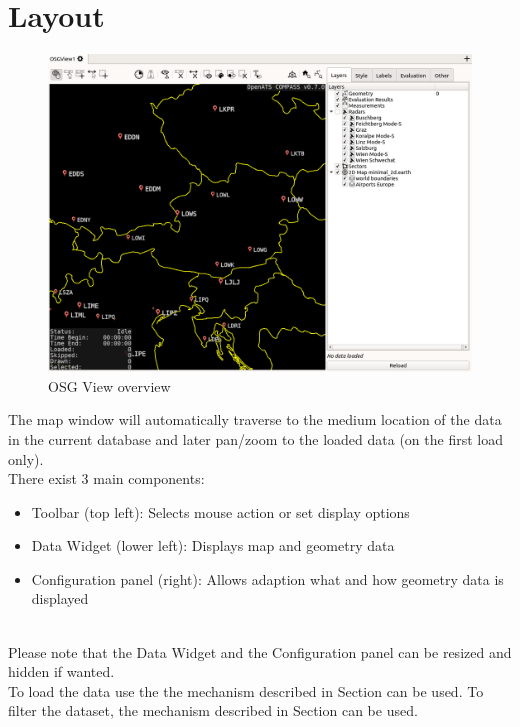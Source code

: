 \section{Layout}

\begin{figure}[H]
    \hspace*{-2.5cm}
    \includegraphics[width=19cm,frame]{figures/osgview_overview.png}
  \caption{OSG View overview}
  \label{fig:osgview_overview}
\end{figure}

The map window will automatically traverse to the medium location of the data in the current database and later pan/zoom to the loaded data (on the first load only). \\

There exist 3 main components:
\begin{itemize}
 \item Toolbar (top left): Selects mouse action or set display options
 \item Data Widget (lower left): Displays map and geometry data
 \item Configuration panel (right): Allows adaption what and how geometry data is displayed
\end{itemize}
\ \\

Please note that the Data Widget and the Configuration panel can be resized and hidden if wanted. \\

To load the data use the the mechanism described in Section  can be used. To filter the dataset, the mechanism described in Section  can be used. \\

